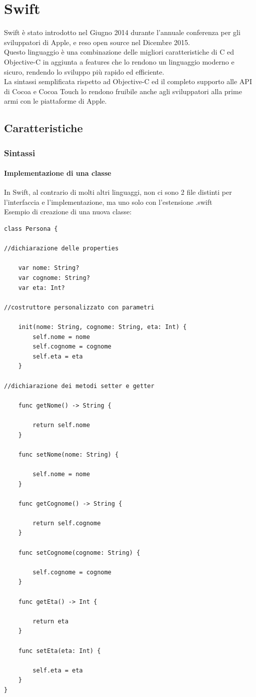 \chapter{Swift}
Swift è stato introdotto nel Giugno 2014 durante l'annuale conferenza per gli sviluppatori di Apple, e reso open source nel Dicembre 2015.\\
Questo linguaggio è una combinazione delle migliori caratteristiche di C ed Objective-C in aggiunta a features che lo rendono un linguaggio moderno e sicuro, rendendo lo sviluppo più rapido ed efficiente.\\La sintassi semplificata rispetto ad Objective-C ed il completo supporto alle API di Cocoa e Cocoa Touch lo rendono fruibile anche agli sviluppatori alla prime armi con le piattaforme di Apple.
\section{Caratteristiche}
\subsection{Sintassi}
\subsubsection{Implementazione di una classe}
In Swift, al contrario di molti altri linguaggi, non ci sono 2 file distinti per l'interfaccia e l'implementazione, ma uno solo con l'estensione .swift\\
Esempio di creazione di una nuova classe:\\
\lstset{language=[Objective]C, breakindent=40pt, breaklines}
\begin{lstlisting}
class Persona { 

//dichiarazione delle properties

	var nome: String? 
	var cognome: String? 
	var eta: Int?

//costruttore personalizzato con parametri 

	init(nome: String, cognome: String, eta: Int) {
		self.nome = nome
		self.cognome = cognome
		self.eta = eta
	}

//dichiarazione dei metodi setter e getter 

	func getNome() -> String {

		return self.nome
	}

	func setNome(nome: String) {

		self.nome = nome
	}

	func getCognome() -> String {

		return self.cognome
	}

	func setCognome(cognome: String) {
	
		self.cognome = cognome
	}

	func getEta() -> Int {
	
		return eta
	}

	func setEta(eta: Int) {

		self.eta = eta
	}
}
\end{lstlisting}
